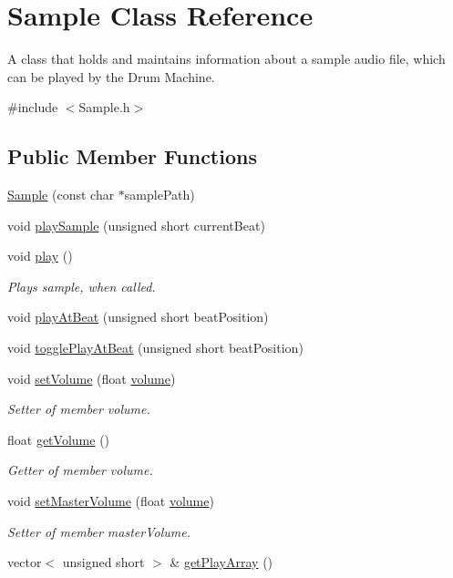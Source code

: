 \hypertarget{class_sample}{}\section{Sample Class Reference}
\label{class_sample}


A class that holds and maintains information about a sample audio file, which can be played by the Drum Machine.  




{\ttfamily \#include $<$Sample.\+h$>$}

\subsection*{Public Member Functions}
\begin{DoxyCompactItemize}
\item 
\hyperlink{class_sample_a7aea6b090998a430341aa6d1d6222c63}{Sample} (const char $\ast$sample\+Path)
\item 
void \hyperlink{class_sample_a720e0e4edc0eacfb6170951177eabc31}{play\+Sample} (unsigned short current\+Beat)
\item 
void \hyperlink{class_sample_a2ccc1c5571e54ba6725714cd795698f3}{play} ()
\begin{DoxyCompactList}\small\item\em Plays sample, when called. \end{DoxyCompactList}\item 
void \hyperlink{class_sample_a26322924f7a05091e13380c6494896da}{play\+At\+Beat} (unsigned short beat\+Position)
\item 
void \hyperlink{class_sample_a4bf009853c35f7a29955fa2554d8e799}{toggle\+Play\+At\+Beat} (unsigned short beat\+Position)
\item 
void \hyperlink{class_sample_ae298bfb5c8c1c3c867fa962e799a2fa5}{set\+Volume} (float \hyperlink{class_sample_a74a4b4799b2bdec9fdde363992b9cec8}{volume})
\begin{DoxyCompactList}\small\item\em Setter of member volume. \end{DoxyCompactList}\item 
float \hyperlink{class_sample_a9f3c251183832a53ec1967331d022575}{get\+Volume} ()
\begin{DoxyCompactList}\small\item\em Getter of member volume. \end{DoxyCompactList}\item 
void \hyperlink{class_sample_af8ad49b65a536c535393e3968516b871}{set\+Master\+Volume} (float \hyperlink{class_sample_a74a4b4799b2bdec9fdde363992b9cec8}{volume})
\begin{DoxyCompactList}\small\item\em Setter of member master\+Volume. \end{DoxyCompactList}\item 
vector$<$ unsigned short $>$ \& \hyperlink{class_sample_a5728b28ce6f6ee19a1b84eddded4fa97}{get\+Play\+Array} ()
\end{DoxyCompactItemize}
